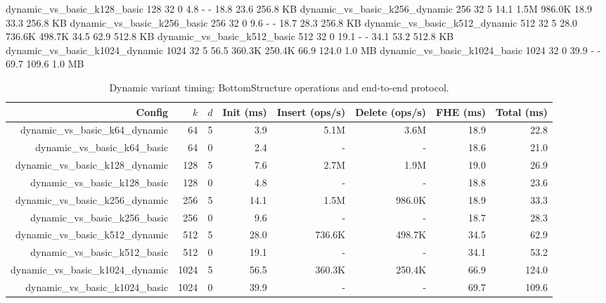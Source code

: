      dynamic_vs_basic_k128_basic   128  32   0        4.8               -               -          18.8        23.6  256.8 KB
   dynamic_vs_basic_k256_dynamic   256  32   5       14.1            1.5M          986.0K          18.9        33.3  256.8 KB
     dynamic_vs_basic_k256_basic   256  32   0        9.6               -               -          18.7        28.3  256.8 KB
   dynamic_vs_basic_k512_dynamic   512  32   5       28.0          736.6K          498.7K          34.5        62.9  512.8 KB
     dynamic_vs_basic_k512_basic   512  32   0       19.1               -               -          34.1        53.2  512.8 KB
  dynamic_vs_basic_k1024_dynamic  1024  32   5       56.5          360.3K          250.4K          66.9       124.0    1.0 MB
    dynamic_vs_basic_k1024_basic  1024  32   0       39.9               -               -          69.7       109.6    1.0 MB

\begin{table}[t]
\centering
\caption{Dynamic variant timing: BottomStructure operations and end-to-end protocol.}
\label{tab:dynamic-timing}
\begin{tabular}{rrrrrrrr}
\toprule
Config & $k$ & $d$ & Init (ms) & Insert (ops/s) & Delete (ops/s) & FHE (ms) & Total (ms) \\
\midrule
dynamic\_vs\_basic\_k64\_dynamic & 64 & 5 & 3.9 & 5.1M & 3.6M & 18.9 & 22.8 \\
dynamic\_vs\_basic\_k64\_basic & 64 & 0 & 2.4 & - & - & 18.6 & 21.0 \\
dynamic\_vs\_basic\_k128\_dynamic & 128 & 5 & 7.6 & 2.7M & 1.9M & 19.0 & 26.9 \\
dynamic\_vs\_basic\_k128\_basic & 128 & 0 & 4.8 & - & - & 18.8 & 23.6 \\
dynamic\_vs\_basic\_k256\_dynamic & 256 & 5 & 14.1 & 1.5M & 986.0K & 18.9 & 33.3 \\
dynamic\_vs\_basic\_k256\_basic & 256 & 0 & 9.6 & - & - & 18.7 & 28.3 \\
dynamic\_vs\_basic\_k512\_dynamic & 512 & 5 & 28.0 & 736.6K & 498.7K & 34.5 & 62.9 \\
dynamic\_vs\_basic\_k512\_basic & 512 & 0 & 19.1 & - & - & 34.1 & 53.2 \\
dynamic\_vs\_basic\_k1024\_dynamic & 1024 & 5 & 56.5 & 360.3K & 250.4K & 66.9 & 124.0 \\
dynamic\_vs\_basic\_k1024\_basic & 1024 & 0 & 39.9 & - & - & 69.7 & 109.6 \\
\bottomrule
\end{tabular}
\end{table}


